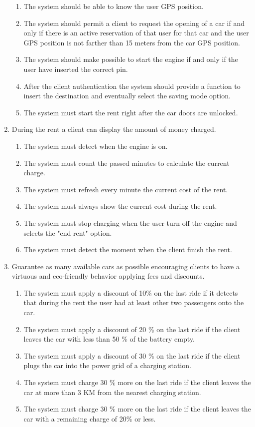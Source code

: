 \begin{enumerate}
\begin{enumerate}
\item The system should be able to know the user GPS position.
\item The system should permit a client to request the opening of a car if and only if there is an active reservation of that user for that car and the user GPS position is not farther than 15 meters from the car GPS position.
\item The system should make possible to start the engine if and only if the user have inserted the correct pin.
\item After the client authentication the system should provide a function to insert the destination and eventually select the saving mode option. 
\item The system must start the rent right after the car doors are unlocked.
\end{enumerate}

\item During the rent a client can display the amount of money charged.
\begin{enumerate}
\item The system must detect when the engine is on.
\item The system must count the passed minutes to calculate the current charge.
\item The system must refresh every minute the current cost of the rent.
\item The system must always show the current cost during the rent.
\item The system must stop charging when the user turn off the engine and selects the "end rent" option.
\item The system must detect the moment when the client finish the rent.
\end{enumerate}

\item Guarantee as many available cars as possible encouraging clients to have a virtuous and eco-friendly behavior applying fees and discounts.
\begin{enumerate}
\item The system must apply  a discount of 10\% on the last ride if it detects that during the rent the user had at least other two passengers onto the car.
\item The system must apply a discount of 20 \% on the last ride if the client leaves the car with less than 50 \% of the battery empty.
\item The system must apply a discount of 30 \% on the last ride if the client plugs the car into the power grid of a charging station.
\item The system must charge 30 \% more on the last ride if the client leaves the car at more than 3 KM from the nearest charging station.
\item The system must charge 30 \% more on the last ride if the client leaves the car with a remaining charge of 20\% or less.
\end{enumerate}
	


\end{enumerate}
